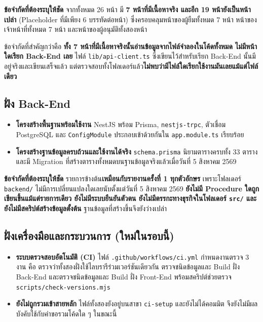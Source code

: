 \noindent\textbf{ข้อจำกัดที่ต้องระบุให้ชัด} จากทั้งหมด 26 หน้า มี \textbf{7 หน้าที่มีเนื้อหาจริง และอีก 19 หน้ายังเป็นหน้าเปล่า} (Placeholder ที่มีเพียง 6 บรรทัดต่อหน้า) ซึ่งครอบคลุมหน้าของผู้ยืมทั้งหมด 7 หน้า หน้าของเจ้าหน้าที่ทั้งหมด 7 หน้า และหน้าของผู้อนุมัติทั้งสองหน้า

ข้อจำกัดที่สำคัญกว่าคือ \textbf{ทั้ง 7 หน้าที่มีเนื้อหาจริงนั้นอ่านข้อมูลจากไฟล์จำลองในโค้ดทั้งหมด ไม่มีหน้าใดเรียก Back-End เลย} ไฟล์ \texttt{lib/api-client.ts} ซึ่งเขียนไว้สำหรับเรียก Back-End นั้นมีอยู่จริงและเขียนเสร็จแล้ว แต่ตรวจสอบทั้งโฟลเดอร์แล้ว\textbf{ไม่พบว่ามีไฟล์ใดเรียกใช้งานมันเลยแม้แต่ไฟล์เดียว}

\subsection{ฝั่ง Back-End}

\begin{itemize}
  \item \textbf{โครงสร้างพื้นฐานพร้อมใช้งาน} NestJS พร้อม Prisma, \texttt{nestjs-trpc}, ตัวเชื่อม PostgreSQL และ \texttt{ConfigModule} ประกอบเข้าด้วยกันใน \texttt{app.module.ts} เรียบร้อย
  \item \textbf{โครงสร้างฐานข้อมูลครบถ้วนและใช้งานได้จริง} \texttt{schema.prisma} นิยามตารางครบทั้ง 33 ตาราง และมี Migration ที่สร้างตารางทั้งหมดบนฐานข้อมูลจริงแล้วเมื่อวันที่ 5 สิงหาคม 2569
\end{itemize}

\noindent\textbf{ข้อจำกัดที่ต้องระบุให้ชัด} รายการข้างต้น\textbf{เหมือนกับรายงานครั้งที่ 1 ทุกตัวอักษร} เพราะโฟลเดอร์ \texttt{backend/} ไม่มีการเปลี่ยนแปลงใดเลยนับตั้งแต่วันที่ 5 สิงหาคม 2569 \textbf{ยังไม่มี Procedure ใดถูกเขียนขึ้นแม้แต่รายการเดียว ยังไม่มีระบบยืนยันตัวตน ยังไม่มีตรรกะทางธุรกิจในโฟลเดอร์ \texttt{src/} และยังไม่มีสคริปต์สร้างข้อมูลตั้งต้น} ฐานข้อมูลที่สร้างขึ้นจึงยังว่างเปล่า

\subsection{ฝั่งเครื่องมือและกระบวนการ (ใหม่ในรอบนี้)}

\begin{itemize}
  \item \textbf{ระบบตรวจสอบอัตโนมัติ (CI)} ไฟล์ \texttt{.github/workflows/ci.yml} กำหนดงานตรวจ 3 งาน คือ ตรวจว่าทั้งสองฝั่งใช้ไลบรารีร่วมเวอร์ชันเดียวกัน ตรวจชนิดข้อมูลและ Build ฝั่ง Back-End และตรวจชนิดข้อมูลและ Build ฝั่ง Front-End พร้อมสคริปต์ช่วยตรวจ \texttt{scripts/check-versions.mjs}
  \item \textbf{ยังไม่ถูกรวมเข้าสายหลัก} ไฟล์ทั้งสองยังอยู่บนสาขา \texttt{ci-setup} และยังไม่ได้คอมมิต จึงยังไม่มีผลบังคับใช้กับคำขอรวมโค้ดใด ๆ ในขณะนี้
\end{itemize}

